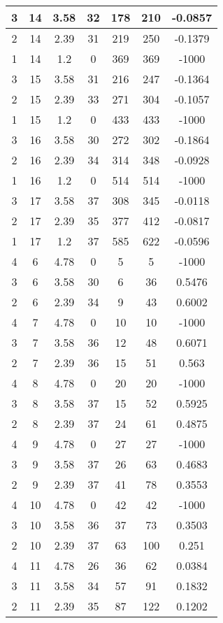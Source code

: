 \documentclass[letterpaper, 12pt]{article}
\begin{document}
\begin{longtable}{|c|c|c|c|c|c|c|}
\hline
3 & 14 & 3.58 & 32 & 178 & 210 & -0.0857 \\
\hline
2 & 14 & 2.39 & 31 & 219 & 250 & -0.1379 \\
\hline
1 & 14 & 1.2 & 0 & 369 & 369 & -1000 \\
\hline
3 & 15 & 3.58 & 31 & 216 & 247 & -0.1364 \\
\hline
2 & 15 & 2.39 & 33 & 271 & 304 & -0.1057 \\
\hline
1 & 15 & 1.2 & 0 & 433 & 433 & -1000 \\
\hline
3 & 16 & 3.58 & 30 & 272 & 302 & -0.1864 \\
\hline
2 & 16 & 2.39 & 34 & 314 & 348 & -0.0928 \\
\hline
1 & 16 & 1.2 & 0 & 514 & 514 & -1000 \\
\hline
3 & 17 & 3.58 & 37 & 308 & 345 & -0.0118 \\
\hline
2 & 17 & 2.39 & 35 & 377 & 412 & -0.0817 \\
\hline
1 & 17 & 1.2 & 37 & 585 & 622 & -0.0596 \\
\hline
4 & 6 & 4.78 & 0 & 5 & 5 & -1000 \\
\hline
3 & 6 & 3.58 & 30 & 6 & 36 & 0.5476 \\
\hline
2 & 6 & 2.39 & 34 & 9 & 43 & 0.6002 \\
\hline
4 & 7 & 4.78 & 0 & 10 & 10 & -1000 \\
\hline
3 & 7 & 3.58 & 36 & 12 & 48 & 0.6071 \\
\hline
2 & 7 & 2.39 & 36 & 15 & 51 & 0.563 \\
\hline
4 & 8 & 4.78 & 0 & 20 & 20 & -1000 \\
\hline
3 & 8 & 3.58 & 37 & 15 & 52 & 0.5925 \\
\hline
2 & 8 & 2.39 & 37 & 24 & 61 & 0.4875 \\
\hline
4 & 9 & 4.78 & 0 & 27 & 27 & -1000 \\
\hline
3 & 9 & 3.58 & 37 & 26 & 63 & 0.4683 \\
\hline
2 & 9 & 2.39 & 37 & 41 & 78 & 0.3553 \\
\hline
4 & 10 & 4.78 & 0 & 42 & 42 & -1000 \\
\hline
3 & 10 & 3.58 & 36 & 37 & 73 & 0.3503 \\
\hline
2 & 10 & 2.39 & 37 & 63 & 100 & 0.251 \\
\hline
4 & 11 & 4.78 & 26 & 36 & 62 & 0.0384 \\
\hline
3 & 11 & 3.58 & 34 & 57 & 91 & 0.1832 \\
\hline
2 & 11 & 2.39 & 35 & 87 & 122 & 0.1202 \\

\end{longtable}
\end{document}

